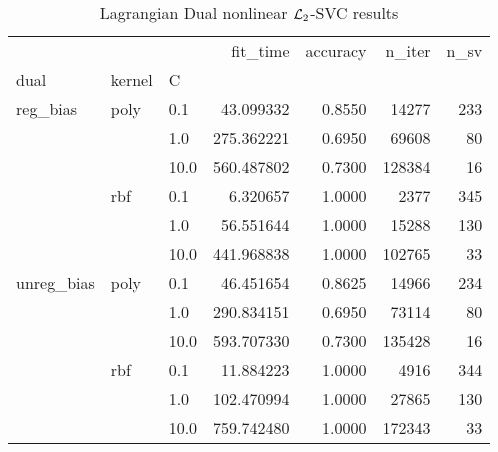 \begin{table}[H]
\centering
\caption{Lagrangian Dual nonlinear $\protect \mathcal{L}_2$-SVC results}
\label{nonlinear_lagrangian_dual_l2_svc_cv_results}
\begin{tabular}{lllrrrr}
\toprule
           &     &      &    fit\_time &  accuracy &  n\_iter &  n\_sv \\
dual & kernel & C &             &           &         &       \\
\midrule
reg\_bias & poly & 0.1  &   43.099332 &    0.8550 &   14277 &   233 \\
           &     & 1.0  &  275.362221 &    0.6950 &   69608 &    80 \\
           &     & 10.0 &  560.487802 &    0.7300 &  128384 &    16 \\
           & rbf & 0.1  &    6.320657 &    1.0000 &    2377 &   345 \\
           &     & 1.0  &   56.551644 &    1.0000 &   15288 &   130 \\
           &     & 10.0 &  441.968838 &    1.0000 &  102765 &    33 \\
unreg\_bias & poly & 0.1  &   46.451654 &    0.8625 &   14966 &   234 \\
           &     & 1.0  &  290.834151 &    0.6950 &   73114 &    80 \\
           &     & 10.0 &  593.707330 &    0.7300 &  135428 &    16 \\
           & rbf & 0.1  &   11.884223 &    1.0000 &    4916 &   344 \\
           &     & 1.0  &  102.470994 &    1.0000 &   27865 &   130 \\
           &     & 10.0 &  759.742480 &    1.0000 &  172343 &    33 \\
\bottomrule
\end{tabular}
\end{table}
